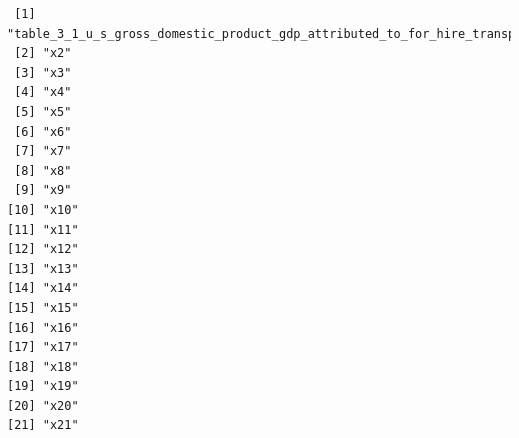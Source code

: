 \documentclass[
  letterpaper,
  DIV=11,
  numbers=noendperiod]{scrreprt}
\begin{document}
\begin{verbatim}
 [1] "table_3_1_u_s_gross_domestic_product_gdp_attributed_to_for_hire_transportation_services_billions_of_current_dollars"
 [2] "x2"                                                                                                                 
 [3] "x3"                                                                                                                 
 [4] "x4"                                                                                                                 
 [5] "x5"                                                                                                                 
 [6] "x6"                                                                                                                 
 [7] "x7"                                                                                                                 
 [8] "x8"                                                                                                                 
 [9] "x9"                                                                                                                 
[10] "x10"                                                                                                                
[11] "x11"                                                                                                                
[12] "x12"                                                                                                                
[13] "x13"                                                                                                                
[14] "x14"                                                                                                                
[15] "x15"                                                                                                                
[16] "x16"                                                                                                                
[17] "x17"                                                                                                                
[18] "x18"                                                                                                                
[19] "x19"                                                                                                                
[20] "x20"                                                                                                                
[21] "x21"                                                                                                                

\end{verbatim}
\end{document}
